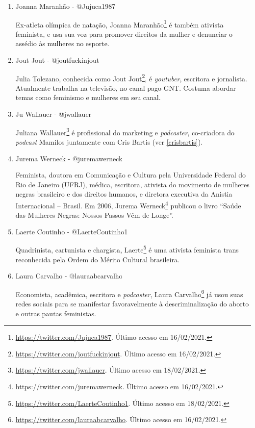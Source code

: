 \documentclass[
	12pt,				%
	openright,			%
	twoside,			%
	a4paper,			%
	english,			%
	brazil				%
	]{abntex2}
\begin{document}
\begin{anexosenv}
\begin{enumerate}
 \item Joanna Maranhão - @Jujuca1987
 
 Ex-atleta olímpica de natação, Joanna Maranhão\footnote{\url{https://twitter.com/Jujuca1987}. Último acesso em 16/02/2021.} é também ativista feminista, e usa sua voz para promover direitos da mulher e denunciar o assédio às mulheres no esporte.

 \item Jout Jout - @joutfuckinjout
 
 Julia Tolezano, conhecida como Jout Jout\footnote{\url{https://twitter.com/joutfuckinjout}. Último acesso em 16/02/2021.}, é \textit{youtuber}, escritora e jornalista. Atualmente trabalha na televisão, no canal pago GNT. Costuma abordar temas como feminismo e mulheres em seu canal.

 \item Ju Wallauer - @jwallauer
 
 Juliana Wallauer\footnote{\url{https://twitter.com/jwallauer}. Último acesso em 18/02/2021.} é profissional do marketing e \textit{podcaster}, co-criadora do \textit{podcast} Mamilos juntamente com Cris Bartis (ver \ref{crisbartis}).

 \item Jurema Werneck - @juremawerneck
 
 Feminista, doutora em Comunicação e Cultura pela Universidade Federal do Rio de Janeiro (UFRJ), médica, escritora, ativista do movimento de mulheres negras brasileiro e dos direitos humanos, e diretora executiva da Anistia Internacional -- Brasil. Em 2006, Jurema Werneck\footnote{\url{https://twitter.com/juremawerneck}. Último acesso em 16/02/2021.} publicou o livro ``Saúde das Mulheres Negras: Nossos Passos Vêm de Longe''.

 \item Laerte Coutinho - @LaerteCoutinho1
 
 Quadrinista, cartunista e chargista, Laerte\footnote{\url{https://twitter.com/LaerteCoutinho1}. Último acesso em 18/02/2021.} é uma ativista feminista trans reconhecida pela Ordem do Mérito Cultural brasileira.
 
 \item Laura Carvalho - @lauraabcarvalho
 
 Economista, acadêmica, escritora e \textit{podcaster}, Laura Carvalho\footnote{\url{https://twitter.com/lauraabcarvalho}. Último acesso em 16/02/2021.} já usou suas redes sociais para se manifestar favoravelmente à descriminalização do aborto e outras pautas feministas.


\end{enumerate}
\end{anexosenv}
\end{document}
